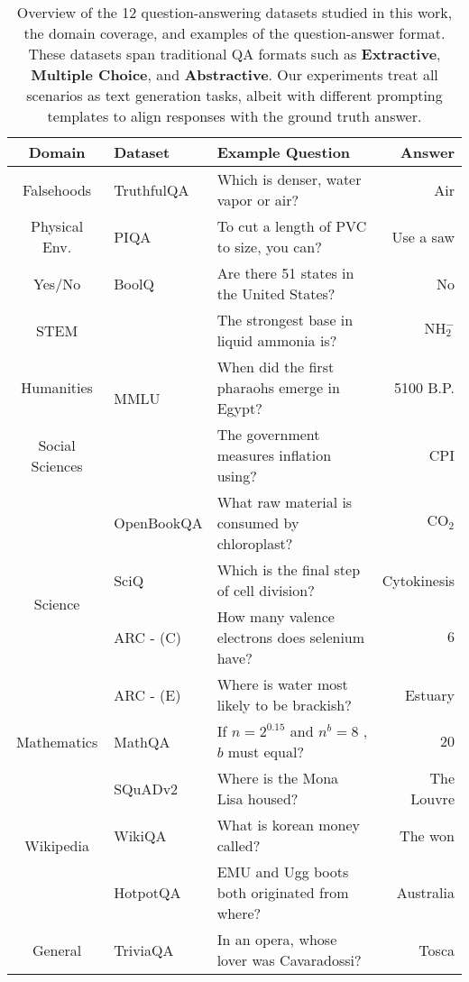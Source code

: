 \begin{table*}[!ht]
\centering
\small
\begin{tabular}{cl|lr}
\hline
\textbf{Domain}  & \textbf{Dataset}  & \textbf{Example Question} & \textbf{Answer} \\
\hline 
Falsehoods     & TruthfulQA &
Which is denser, water vapor or air? & Air\\ \hline
Physical Env.  & PIQA &
To cut a length of PVC to size, you can? & Use a saw\\ \hline
Yes/No         & BoolQ &
Are there 51 states in the United States? & No \\ \hline
STEM   & \multirow{3}{*}{MMLU} &
The strongest base in liquid ammonia is? & $\text{NH}_2^-$ \\
Humanities & &
When did the first pharaohs emerge in Egypt? & 5100 B.P.\\
Social Sciences &  &
The government measures inflation using? & CPI
\\ \hline
\multirow{4}{*}{Science} & OpenBookQA &
What raw material is consumed by chloroplast? & $\text{CO}_2$\\
& SciQ & 
Which is the final step of cell division? & Cytokinesis \\
& ARC - (C)  &
How many valence electrons does selenium have?	& $6$ \\
& ARC - (E)  &
Where is water most likely to be brackish? & Estuary\\ \hline
Mathematics & MathQA & 
If $n = 2^{0.15}$ and $n^b = 8$ , $b$ must equal? & $20$\\ \hline
\multirow{3}{*}{Wikipedia} & SQuADv2 &
Where is the Mona Lisa housed? & The Louvre \\
& WikiQA & 
What is korean money called? & The won\\
& HotpotQA & 
EMU and Ugg boots both originated from where? & Australia\\ \hline
General & TriviaQA & 
In an opera, whose lover was Cavaradossi? & Tosca\\
\hline
\end{tabular}
\caption{\label{tab:overview}
Overview of the 12 question-answering datasets studied in this work, the domain coverage, and examples of the question-answer format. These datasets span traditional QA formats such as {\color{BrickRed} \textbf{Extractive}}, {\color{ForestGreen} \textbf{Multiple Choice}}, and {\color{Mulberry} \textbf{Abstractive}}. Our experiments treat all scenarios as text generation tasks, albeit with different prompting templates to align responses with the ground truth answer.
}
\vspace{-3mm}
\end{table*}